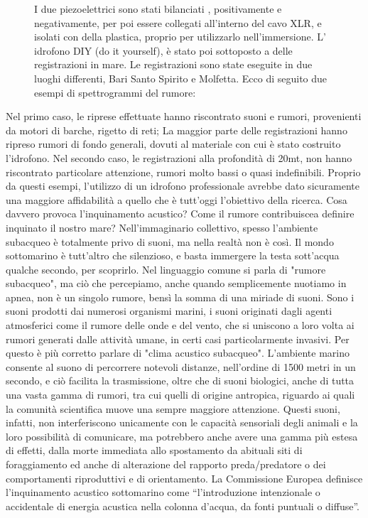 \begin{figure}
\centering
{} \quad

I due piezoelettrici sono stati bilanciati , positivamente e negativamente, per poi essere collegati all'interno del cavo XLR, e isolati con della plastica, proprio per utilizzarlo nell'immersione. L' idrofono DIY (do it yourself), è stato poi sottoposto a delle registrazioni in mare. Le registrazioni sono state eseguite in due luoghi differenti, Bari Santo Spirito e Molfetta. Ecco di seguito due esempi di spettrogrammi del rumore: 

 \quad
{} \quad
\end{figure}

Nel primo caso, le riprese effettuate hanno riscontrato suoni e rumori, provenienti da motori di barche, rigetto di reti; La maggior parte delle registrazioni hanno ripreso rumori di fondo generali, dovuti al materiale con cui è stato costruito l'idrofono. 
Nel secondo caso, le registrazioni alla profondità di 20mt, non hanno riscontrato particolare attenzione, rumori molto bassi o quasi indefinibili. 
Proprio da questi esempi, l'utilizzo di un idrofono professionale avrebbe dato sicuramente una maggiore affidabilità a quello che è tutt'oggi l'obiettivo della ricerca. Cosa davvero provoca l'inquinamento acustico? Come il rumore contribuiscea definire inquinato il nostro mare?
Nell'immaginario collettivo, spesso l'ambiente subacqueo è totalmente privo di suoni, ma nella realtà non è così. Il mondo sottomarino è tutt'altro che silenzioso, e basta immergere la testa sott'acqua qualche secondo, per scoprirlo.
Nel linguaggio comune si parla di "rumore subacqueo", ma ciò che percepiamo, anche quando semplicemente nuotiamo in apnea, non è un singolo rumore, bensì la somma di una miriade di suoni. Sono i suoni prodotti dai numerosi organismi marini, i suoni originati dagli agenti atmosferici come il rumore delle onde e del vento, che si uniscono a loro volta ai rumori generati dalle attività umane, in certi casi particolarmente invasivi.
Per questo è più corretto parlare di "clima acustico subacqueo". 
L’ambiente marino consente al suono di percorrere notevoli distanze, nell’ordine di 1500 metri in un secondo, e ciò facilita la trasmissione, oltre che di suoni biologici, anche di tutta una vasta gamma di rumori, tra cui quelli di origine antropica, riguardo ai quali la comunità scientifica muove una sempre maggiore attenzione. Questi suoni, infatti, non interferiscono unicamente con le capacità sensoriali degli animali e la loro possibilità di comunicare, ma potrebbero anche avere una gamma più estesa di effetti, dalla morte immediata allo spostamento da abituali siti di foraggiamento ed anche di alterazione del rapporto preda/predatore o dei comportamenti riproduttivi e di orientamento. 
La Commissione Europea definisce l’inquinamento acustico sottomarino come “l’introduzione intenzionale o accidentale di energia acustica nella colonna d’acqua, da fonti puntuali o diffuse”.

